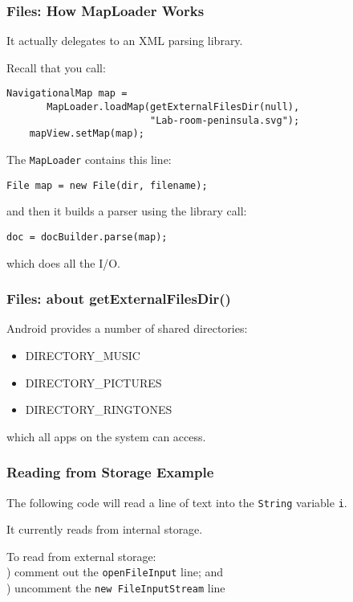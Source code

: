 \begin{frame}[fragile]
\frametitle{Files: How MapLoader Works}
\begin{changemargin}{1cm}
It actually delegates to an XML parsing library. 

Recall that you call:
\begin{lstlisting}[basicstyle=\scriptsize]
    NavigationalMap map = 
       MapLoader.loadMap(getExternalFilesDir(null), 
                         "Lab-room-peninsula.svg");
    mapView.setMap(map);
\end{lstlisting}

The {\tt MapLoader} contains this line:
\begin{lstlisting}
File map = new File(dir, filename);
\end{lstlisting}
and then it builds a parser using the library call:
\begin{lstlisting}
doc = docBuilder.parse(map);
\end{lstlisting}
which does all the I/O.

\end{changemargin}
\end{frame}

\begin{frame}
\frametitle{Files: about getExternalFilesDir()}

\begin{changemargin}{1cm}
Android provides a number of shared directories:
\begin{itemize}
\item DIRECTORY\_MUSIC
\item DIRECTORY\_PICTURES
\item DIRECTORY\_RINGTONES
\end{itemize}
which all apps on the system can access.

\end{changemargin}


\end{frame}

\begin{frame}
\frametitle{Reading from Storage Example}
\begin{changemargin}{1cm}

The following code will read a line of text
into the {\tt String} variable {\tt i}.

It currently reads from internal storage.

To read from external storage: \\
) comment out the {\tt openFileInput} line; and\\
) uncomment the {\tt new FileInputStream} line
\end{changemargin}
\end{frame}

